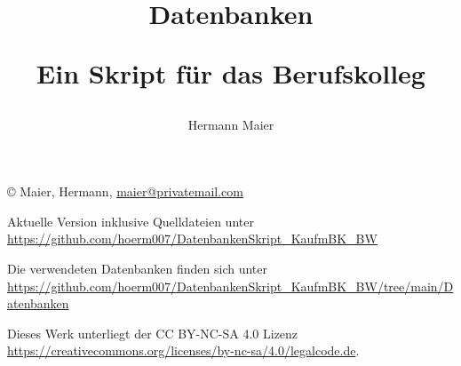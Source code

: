 \documentclass[a4paper,12pt, headsepline, ngerman]{scrartcl}
\begin{document}
	\setlength\parindent{0pt} %

	\rohead{}
	\cofoot[\pagemark]{\pagemark}
	\title{Datenbanken

	Ein Skript für das Berufskolleg}
	\author{Hermann Maier}
	\maketitle
	\thispagestyle{empty}
	\newpage
	\null\vfill
	\copyright \the\year{} Maier, Hermann, \href{mailto:maier@privatemail.com}{maier@privatemail.com}

    Aktuelle Version inklusive Quelldateien unter \href{https://github.com/hoerm007/DatenbankenSkript_KaufmBK_BW}{https://github.com/hoerm007/DatenbankenSkript\_KaufmBK\_BW}

    \begin{tcolorbox}\raggedright
        Die verwendeten Datenbanken finden sich unter
        {\small\href{https://github.com/hoerm007/DatenbankenSkript\_KaufmBK\_BW/tree/main/Datenbanken}{https://github.com/hoerm007/DatenbankenSkript\_KaufmBK\_BW/tree/main/Datenbanken}}
    \end{tcolorbox}

	Dieses Werk unterliegt der CC BY-NC-SA 4.0 Lizenz \href{https://creativecommons.org/licenses/by-nc-sa/4.0/legalcode.de}{https://creativecommons.org/licenses/by-nc-sa/4.0/legalcode.de}.
\end{document}
